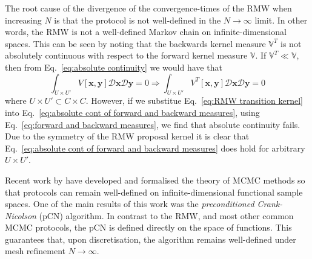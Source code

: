 The root cause of the divergence of the convergence-times of the RMW when increasing $N$ is that the protocol is not well-defined in the $N \to \infty$ limit. In other words, the RMW is not a well-defined Markov chain on infinite-dimensional spaces. This can be seen by noting that the backwards kernel measure $\mathbb{V}^T$ is not absolutely continuous with respect to the forward kernel measure $\mathbb{V}$. If $\mathbb{V}^T \ll \mathbb{V}$, then from Eq.~\ref{eq:absolute continuity} we would have that
\begin{equation} \label{eq:absolute cont of forward and backward measures}
	\int_{U \times U'} V[\mathbf{x}, \mathbf{y}] \mathcal{D}\mathbf{x} \mathcal{D}\mathbf{y} = 0 \Rightarrow  \int_{U \times U'} V^T[\mathbf{x}, \mathbf{y}] \mathcal{D}\mathbf{x} \mathcal{D}\mathbf{y} = 0
\end{equation}
where $U \times U' \subset C \times C$. However, if we substitue Eq.~\ref{eq:RMW transition kernel} into Eq.~\ref{eq:absolute cont of forward and backward measures}, using Eq.~\ref{eq:forward and backward measures}, we find that absolute continuity fails. Due to the symmetry of the RMW proposal kernel it is clear that Eq.~\ref{eq:absolute cont of forward and backward measures} does hold for arbitrary $U \times U'$.

Recent work by \citep{beskosMCMCMETHODSDIFFUSION2008, cotterMCMCMethodsFunctions2013, hairerAnalysisSPDEsArising2005, hairerAnalysisSPDEsArising2007} have developed and formalised the theory of MCMC methods so that protocols can remain well-defined on infinite-dimensional functional sample spaces. One of the main results of this work was the \textit{preconditioned Crank-Nicolson} (pCN) algorithm. In contrast to the RMW, and most other common MCMC protocols, the pCN is defined directly on the space of functions. This guarantees that, upon discretisation, the algorithm remains well-defined under mesh refinement $N \to \infty$.

